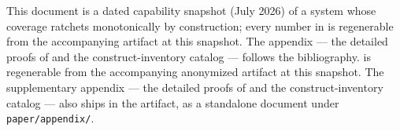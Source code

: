 This document is a dated capability snapshot (July 2026) of a system
whose coverage ratchets monotonically by construction; every number in
\ifarxiv
{} is regenerable from the accompanying
artifact at this snapshot. The appendix --- the detailed
proofs of  and the construct-inventory
catalog --- follows the bibliography.
\else
{} is regenerable from the accompanying anonymized
artifact at this snapshot. The supplementary appendix --- the detailed
proofs of  and the construct-inventory
catalog --- also ships in the artifact, as a standalone document under
\texttt{paper/appendix/}.
\fi
